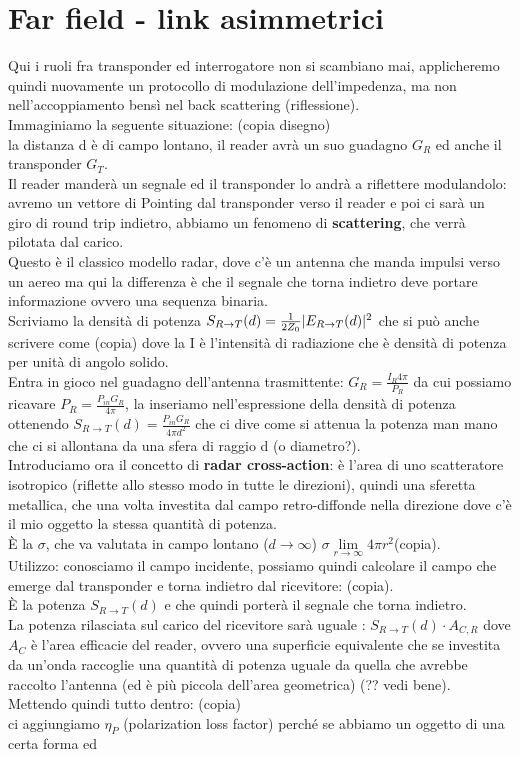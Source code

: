 \documentclass[oneside, 12pt]{extbook}
\DeclarePairedDelimiter{\abs}{\lvert}{\rvert}
\begin{document}
\section{Far field - link asimmetrici}
Qui i ruoli fra transponder ed interrogatore non si scambiano mai, applicheremo quindi nuovamente un protocollo di modulazione dell'impedenza, ma non nell'accoppiamento bensì nel back scattering (riflessione).\\Immaginiamo la seguente situazione: (copia disegno)\\la distanza d è di campo lontano, il reader avrà un suo guadagno $G_R$ ed anche il transponder $G_T$.\\Il reader manderà un segnale ed il transponder lo andrà a riflettere modulandolo: avremo un vettore di Pointing dal transponder verso il reader e poi ci sarà un giro di round trip indietro, abbiamo un fenomeno di \textbf{scattering}, che verrà pilotata dal carico.\\Questo è il classico modello radar, dove c'è un antenna che manda impulsi verso un aereo ma qui la differenza è che il segnale che torna indietro deve portare informazione ovvero una sequenza binaria.\\Scriviamo la densità di potenza $S_{R \rightarrow T}(d) = \frac{1}{2Z_0}\abs{E_{R \rightarrow T}(d)}^2$ che si può anche scrivere come (copia) dove la I è l'intensità di radiazione che è densità di potenza per unità di angolo solido.\\Entra in gioco nel guadagno dell'antenna trasmittente: $G_R = \frac{I_R 4\pi}{P_R}$ da cui possiamo ricavare $P_R = \frac{P_{in}G_R}{4 \pi}$, la inseriamo nell'espressione della densità di potenza ottenendo $S_{R \rightarrow T}(d) = \frac{P_{in}G_R}{4 \pi d^2}$ che ci dive come si attenua la potenza man mano che ci si allontana da una sfera di raggio d (o diametro?).\\Introduciamo ora il concetto di \textbf{radar cross-action}: è l'area di uno scatteratore isotropico (riflette allo stesso modo in tutte le direzioni), quindi una sferetta metallica, che una volta investita dal campo retro-diffonde nella direzione dove c'è il mio oggetto la stessa quantità di potenza.\\È la $\sigma$, che va valutata in campo lontano ($d \rightarrow \infty$) $\sigma \lim\limits_{r \rightarrow \infty} 4 \pi r^2 $(copia).\\Utilizzo: conosciamo il campo incidente, possiamo quindi calcolare il campo che emerge dal transponder e torna indietro dal ricevitore: (copia).\\È la potenza $S_{R \rightarrow T}(d)$ e che quindi porterà il segnale che torna indietro.\\La potenza rilasciata sul carico del ricevitore sarà uguale : $S_{R \rightarrow T}(d) \cdot A_{C,R}$ dove $A_C$ è l'area efficacie del reader, ovvero una superficie equivalente che se investita da un'onda raccoglie una quantità di potenza uguale da quella che avrebbe raccolto l'antenna (ed è più piccola dell'area geometrica) (?? vedi bene).\\Mettendo quindi tutto dentro: (copia)\\ci aggiungiamo $\eta_P$ (polarization loss factor) perché se abbiamo un oggetto di una certa forma ed 
\end{document}

